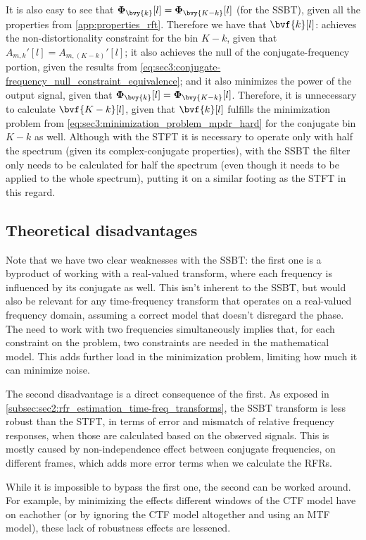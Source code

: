 It is also easy to see that $\Corr{\bvy{k}}[l] = \Corr{\bvy{K-k}}[l]$ (for the SSBT), given all the properties from \cref{app:properties_rft}. Therefore we have that $\bvf{k}[l]$: achieves the non-distortionality constraint for the bin $K-k$, given that $A_{m,k}'[l] = A_{m,(K-k)}'[l]$; it also achieves the null of the conjugate-frequency portion, given the results from \cref{eq:sec3:conjugate-frequency_null_constraint_equivalence}; and it also minimizes the power of the output signal, given that $\Corr{\bvy{k}}[l] = \Corr{\bvy{K-k}}[l]$. Therefore, it is unnecessary to calculate $\bvf{K-k}[l]$, given that $\bvf{k}[l]$ fulfills the minimization problem from \cref{eq:sec3:minimization_problem_mpdr_hard} for the conjugate bin $K-k$ as well. Although with the STFT it is necessary to operate only with half the spectrum (given its complex-conjugate properties), with the SSBT the filter only needs to be calculated for half the spectrum (even though it needs to be applied to the whole spectrum), putting it on a similar footing as the STFT in this regard.

\subsection{Theoretical disadvantages}

Note that we have two clear weaknesses with the SSBT: the first one is a byproduct of working with a real-valued transform, where each frequency is influenced by its conjugate as well. This isn't inherent to the SSBT, but would also be relevant for any time-frequency transform that operates on a real-valued frequency domain, assuming a correct model that doesn't disregard the phase. The need to work with two frequencies simultaneously implies that, for each constraint on the problem, two constraints are needed in the mathematical model. This adds further load in the minimization problem, limiting how much it can minimize noise.

The second disadvantage is a direct consequence of the first. As exposed in \cref{subsec:sec2:rfr_estimation_time-freq_transforms}, the SSBT transform is less robust than the STFT, in terms of error and mismatch of relative frequency responses, when those are calculated based on the observed signals. This is mostly caused by non-independence effect between conjugate frequencies, on different frames, which adds more error terms when we calculate the RFRs.

While it is impossible to bypass the first one, the second can be worked around. For example, by minimizing the effects different windows of the CTF model have on eachother (or by ignoring the CTF model altogether and using an MTF model), these lack of robustness effects are lessened.